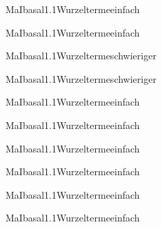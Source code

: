 \documentclass[12pt]{article}
\begin{document}
    \begin{Add}{MaI}{basal1.1}{Wurzelterme}{einfach}
    \solution{ }
    \end{Add}
    \begin{Add}{MaI}{basal1.1}{Wurzelterme}{einfach}
    \end{Add}
    

   \begin{Add}{MaI}{basal1.1}{Wurzelterme}{schwieriger}
   \solution{ }
   \end{Add}
   \begin{Add}{MaI}{basal1.1}{Wurzelterme}{schwieriger}
   \end{Add}
   

    \begin{Add}{MaI}{basal1.1}{Wurzelterme}{einfach}
    \solution{ }
    \end{Add}
    \begin{Add}{MaI}{basal1.1}{Wurzelterme}{einfach}
    \end{Add}
    

    \begin{Add}{MaI}{basal1.1}{Wurzelterme}{einfach}
    \solution{ }
    \end{Add}
    \begin{Add}{MaI}{basal1.1}{Wurzelterme}{einfach}
    \end{Add}
    

    \begin{Add}{MaI}{basal1.1}{Wurzelterme}{einfach}
    \solution{ }
    \end{Add}
    \begin{Add}{MaI}{basal1.1}{Wurzelterme}{einfach}
    \end{Add}
    
\end{document}
